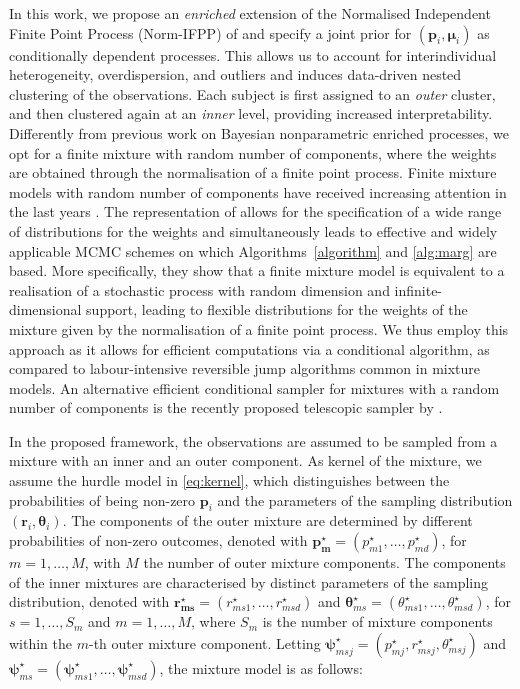 \documentclass[11pt]{article}
\begin{document}
In this work, we propose an \textit{enriched} extension of the Normalised Independent Finite Point Process (Norm-IFPP) of \citet{Argiento2022} and specify a joint prior for $\left(\bm p_i, \bm\mu_i\right)$ as conditionally dependent processes. This allows us to account for interindividual heterogeneity, overdispersion, and outliers and induces data-driven nested clustering of the observations. Each subject is first assigned to an \textit{outer} cluster, and then  clustered again at an \textit{inner} level, providing increased interpretability.
Differently from previous work on Bayesian nonparametric enriched processes, we opt for a finite mixture with random number of components, where the weights are obtained through the normalisation of a finite point process. Finite mixture models with random number of components have received increasing attention in the last years \citep[see, for example,][]{ malsiner2016model,miller2018mixture}. The representation of \citet{Argiento2022} allows for the specification of a wide range of distributions for the weights and simultaneously leads to effective and widely applicable MCMC schemes on which   Algorithms~\ref{algorithm} and \ref{alg:marg} are based. More specifically, they show that a finite mixture model is equivalent to a realisation of a stochastic process with random dimension and infinite-dimensional support, leading to flexible distributions for the weights of the mixture given by the normalisation of a finite point process. We thus employ this approach as it allows for efficient computations via a conditional algorithm, as compared to labour-intensive reversible jump algorithms common in mixture models. An alternative efficient conditional sampler for mixtures with a random number of components is the recently proposed telescopic sampler by \cite{fruhwirth2021generalized}.

In the proposed framework, the observations are assumed to be sampled from a mixture with an inner and an outer component. As kernel of the mixture, we assume the hurdle model in \eqref{eq:kernel}, which distinguishes between the probabilities of being non-zero $\bm{p}_i$ and the parameters of the sampling distribution $(\bm{r}_i, \bm{\theta}_i)$. The components of the outer mixture are determined by different probabilities of non-zero outcomes, denoted with $\bm {p_m^\star} = (p^\star_{m1},\ldots, p^\star_{md})$, for $m=1,\ldots,M$, with $M$ the number of outer mixture components. The components of the inner mixtures are characterised by distinct parameters of the sampling distribution, denoted with $\bm {r^\star_{ms}} = (r^\star_{ms1},\ldots, r^\star_{msd})$ and $\bm \theta^\star_{ms} = (\theta^\star_{ms1},\ldots, \theta^\star_{msd})$, for $s=1,\ldots,S_m$ and $m=1,\ldots,M$, where $S_m$ is the number of mixture components within the $m$-th outer mixture component. 
Letting $\bm \psi^\star_{msj} = \left(p^\star_{mj}, r^\star_{msj}, \theta^\star_{msj} \right)$ and $\bm \psi^\star_{ms} = \left(\bm \psi^\star_{ms1}, \dots, \bm \psi^\star_{msd}\right)$, the mixture model is as follows:
\end{document}
